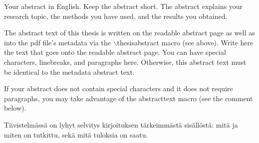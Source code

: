 \documentclass[english, 12pt, a4paper, elec, utf8, a-1b, online]{aaltothesis}
\date{1.6.2020}
\begin{document}
\makecoverpage

\makecopyrightpage


\begin{abstractpage}[english]
  Your abstract in English. Keep the abstract short. The abstract explains your
  research topic, the methods you have used, and the results you obtained.  
  
  The abstract text of this thesis is written on the readable abstract page as
  well as into the pdf file's metadata via the $\backslash$thesisabstract macro
  (see above). Write here the text that goes onto the readable abstract page.
  You can have special characters, linebreaks, and paragraphs here. Otherwise,
  this abstract text must be identical to the metadata abstract text.
  
  If your abstract does not contain special characters and it does not require
  paragraphs, you may take advantage of the abstracttext macro (see the comment
  below).
\end{abstractpage}

\newpage
\begin{abstractpage}[finnish]
  Tiivistelmässä on lyhyt selvitys
  kirjoituksen tärkeimmästä sisällöstä: mitä ja miten on tutkittu,
  sekä mitä tuloksia on saatu. 
\end{abstractpage}

\newpage
\end{document}
